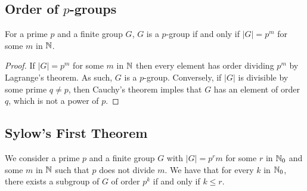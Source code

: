 \subsection{Order of $p$-groups}

For a prime $p$ and a finite group $G$, $G$ is a $p$-group if
and only if $|G| = p^m$ for some $m$ in $\mathbb{N}$.

\begin{proof}
    If $|G| = p^m$ for some $m$ in $\mathbb{N}$ then every element has
    order dividing $p^m$ by Lagrange's theorem. As such, $G$ is a
    $p$-group. Conversely, if $|G|$ is divisible by some prime
    $q \neq p$, then Cauchy's theorem imples that $G$ has
    an element of order $q$, which is not a power of $p$.
\end{proof}

\subsection{Sylow's First Theorem}

We consider a prime $p$ and a finite group $G$ with $|G| = p^rm$ 
for some $r$ in $\mathbb{N}_0$ and some $m$ in $\mathbb{N}$ such that $p$ 
does not divide $m$. We have that for every $k$ in $\mathbb{N}_0$,
there exists a subgroup of $G$ of order $p^k$ if and only if
$k \leq r$.

